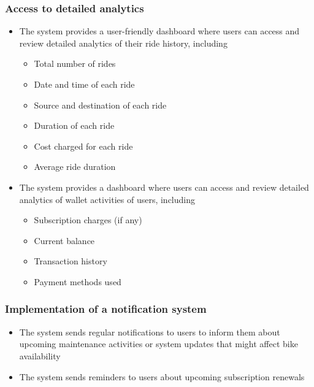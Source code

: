 \documentclass[11pt]{article}
\begin{document}
\subsubsection{Access to detailed analytics}
\begin{itemize}
    \item The system provides a user-friendly dashboard where users can access and review detailed analytics of their ride history, including
    \begin{itemize}[label={*}]
        \item Total number of rides
        \item Date and time of each ride
        \item Source and destination of each ride
        \item Duration of each ride
        \item Cost charged for each ride
        \item Average ride duration
    \end{itemize}
    \item The system provides a dashboard where users can access and review detailed analytics of wallet activities of users, including
    \begin{itemize}[label={*}]
        \item Subscription charges (if any)
        \item Current balance
        \item Transaction history
        \item Payment methods used
    \end{itemize}
\end{itemize}

\subsubsection{Implementation of a notification system}
\begin{itemize}
    \item The system sends regular notifications to users to inform them about upcoming maintenance activities or system updates that might affect bike availability
    \item The system sends reminders to users about upcoming subscription renewals
\end{itemize}
\newpage
\end{document}
